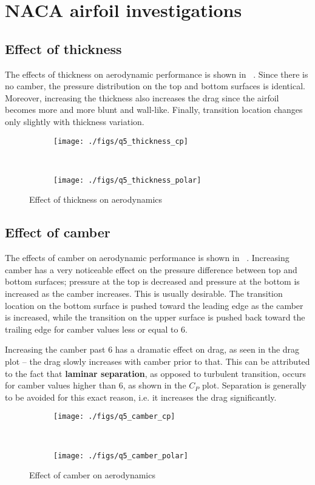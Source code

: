 \section{NACA airfoil investigations}

\subsection{Effect of thickness}
The effects of thickness on aerodynamic performance is shown in
~. Since there is no camber, the pressure distribution
on the top and bottom surfaces is identical. Moreover, increasing the thickness
also increases the drag since the airfoil becomes more and more blunt and
wall-like. Finally, transition location changes only slightly with thickness variation.
\begin{figure}[H]
    \centering
    \begin{subfigure}{0.8\textwidth}
    \texttt{[image: ./figs/q5\_thickness\_cp]}
    \end{subfigure}
    \\
    \begin{subfigure}{0.8\textwidth}
    \texttt{[image: ./figs/q5\_thickness\_polar]}
    \end{subfigure}
    \caption{Effect of thickness on aerodynamics}\label{fig:q5_thickness}
\end{figure}

\subsection{Effect of camber}
The effects of camber on aerodynamic performance is shown in
~. Increasing camber has a very noticeable effect on the
pressure difference between top and bottom surfaces; pressure at the top is decreased
and pressure at the bottom is increased as the camber increases. This is
usually desirable. The transition location on the bottom surface is pushed toward
the leading edge as the camber is increased, while the transition on the upper surface is pushed
back toward the trailing edge for camber values less or equal to 6.

Increasing the camber past 6 has a dramatic effect on drag, as seen in the drag
plot -- the drag slowly increases with camber prior to that. This can be attributed to the
fact that \textbf{laminar separation}, as opposed to turbulent transition, occurs for camber values higher
than 6, as shown in the $C_P$ plot. Separation is generally to be avoided for this exact reason,
i.e. it increases the drag significantly.
\begin{figure}[H]
    \centering
    \begin{subfigure}{0.8\textwidth}
    \texttt{[image: ./figs/q5\_camber\_cp]}
    \end{subfigure}
    \\
    \begin{subfigure}{0.8\textwidth}
    \texttt{[image: ./figs/q5\_camber\_polar]}
    \end{subfigure}
    \caption{Effect of camber on aerodynamics}\label{fig:q5_camber}
\end{figure}

